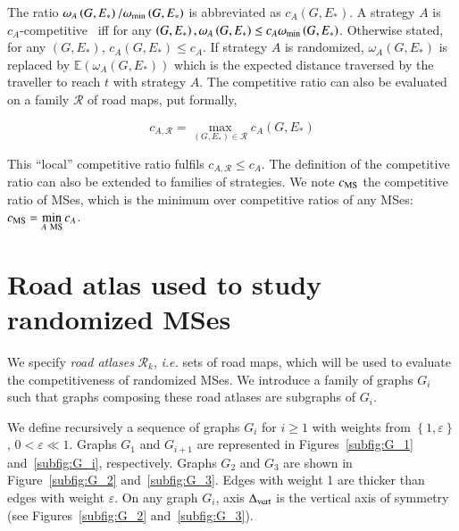 \documentclass[preprint]{elsarticle}
\newcommand{\set}[1]{\left\{ #1 \right\}}
\newcommand{\omegamin}{\omega_{\mbox{\scriptsize{min}}}}
\newcommand{\mcalr}{\mathcal{R}}
\newcommand{\mts}{MS}
\newcommand{\deltavert}{\Delta_{\mbox{\scriptsize{vert}}}}
\newcommand{\cms}{c_{\mbox{\scriptsize{MS}}}}
\begin{document}
The ratio $\omega_A\left(G,E_*\right)/\omegamin\left(G,E_*\right)$ is abbreviated as $c_A\left(G,E_*\right)$. A strategy $A$ is $c_A$-competitive~\cite{BoEl98,XuHuSuZh09} iff for any $\left(G,E_*\right), \omega_A\left(G,E_*\right) \leq c_A \omegamin\left(G,E_*\right)$. Otherwise stated, for any $\left(G,E_*\right)$, $c_A\left(G,E_*\right) \leq c_A$. If strategy $A$ is randomized, $\omega_A\left(G,E_*\right)$ is replaced by $\mathbb{E}\left(\omega_A\left(G,E_*\right)\right)$ which is the expected distance traversed by the traveller to reach $t$ with strategy $A$. The competitive ratio can also be evaluated on a family $\mathcal{R}$ of road maps, put formally,

\begin{equation}
c_{A,\mathcal{R}} = \max\limits_{\left(G,E_*\right) \in \mathcal{R}} c_A\left(G,E_*\right)
\end{equation}

This ``local'' competitive ratio fulfils $c_{A,\mathcal{R}} \le c_A$. The definition of the competitive ratio can also be extended to families of strategies. We note $\cms$ the competitive ratio of \mts es, which is the minimum over competitive ratios of any \mts es: $\cms = \min\limits_{A ~\mbox{\scriptsize{\mts}}} c_A$. 
\section{Road atlas used to study randomized \mts es} \label{sec:roadatlas}

We specify \textit{road atlases} $\mathcal{R}_k$, {\em i.e.} sets of road maps, which will be used to evaluate the competitiveness of randomized \mts es. We introduce a family of graphs $G_i$ such that graphs composing these road atlases are subgraphs of $G_i$. 


We define recursively a sequence of graphs $G_i$ for $i \geq 1$ with weights from $\set{1,\varepsilon}$, $0 < \varepsilon \ll 1$. Graphs $G_1$ and $G_{i+1}$ are represented in Figures~\ref{subfig:G_1} and~\ref{subfig:G_i}, respectively. Graphs $G_2$ and $G_3$ are shown in Figure~\ref{subfig:G_2} and~\ref{subfig:G_3}. Edges with weight 1 are thicker than edges with weight $\varepsilon$. On any graph $G_i$, axis $\deltavert$ is the vertical axis of symmetry (see Figures~\ref{subfig:G_2} and~\ref{subfig:G_3}).
\end{document}
